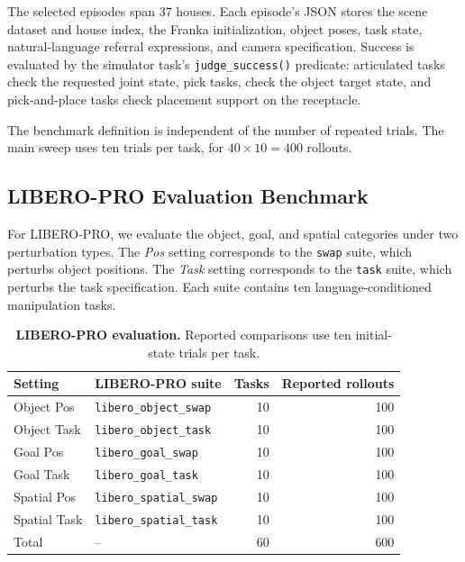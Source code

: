 \documentclass{llmxive}
\begin{document}
The selected episodes span 37 houses. Each episode's JSON stores the scene
dataset and house index, the Franka initialization, object poses, task state,
natural-language referral expressions, and camera specification. Success is evaluated by the simulator task's \texttt{judge\_success()} predicate: articulated tasks check the requested
joint state, pick tasks, check the object target state, and pick-and-place tasks
check placement support on the receptacle.

The benchmark definition is independent of the number of repeated trials. The
main sweep uses ten trials per task, for $40 \times 10 = 400$ rollouts.

\subsection{LIBERO-PRO Evaluation Benchmark}
\label{sec:appendix_libero_pro_benchmark}

For LIBERO-PRO, we evaluate the object, goal, and spatial
categories under two perturbation types. The \emph{Pos} setting corresponds to
the \texttt{swap} suite, which perturbs object positions. The \emph{Task}
setting corresponds to the \texttt{task} suite, which perturbs the task
specification. Each suite contains ten language-conditioned manipulation
tasks.

\begin{table}[t]
\centering
\begin{tabular}{llrr}
\toprule
\textbf{Setting} & \textbf{LIBERO-PRO suite} & \textbf{Tasks} & \textbf{Reported rollouts} \\
\midrule
Object Pos & \texttt{libero\_object\_swap} & 10 & 100 \\
Object Task & \texttt{libero\_object\_task} & 10 & 100 \\
Goal Pos & \texttt{libero\_goal\_swap} & 10 & 100 \\
Goal Task & \texttt{libero\_goal\_task} & 10 & 100 \\
Spatial Pos & \texttt{libero\_spatial\_swap} & 10 & 100 \\
Spatial Task & \texttt{libero\_spatial\_task} & 10 & 100 \\
\midrule
Total & -- & 60 & 600 \\
\bottomrule
\end{tabular}

\caption{
\textbf{LIBERO-PRO evaluation.}
Reported comparisons use ten initial-state trials per task.
}
\label{tab:libero_pro_eval_benchmark}
\end{table}
\end{document}
